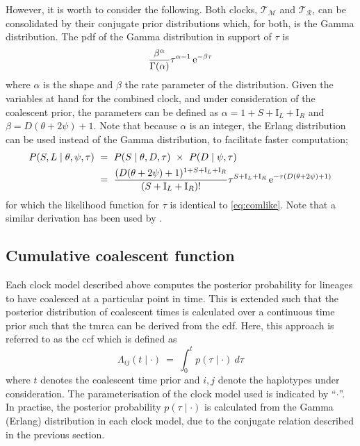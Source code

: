 However, it is worth to consider the following.
Both clocks, $\mathcal{T_{\!\!M}}$ and $\mathcal{T_{\!R}}$, can be consolidated by their conjugate prior distributions which, for both, is the Gamma distribution.
The \gls{pdf} of the Gamma distribution in support of $\tau$ is
\begin{equation*}
	\frac{\beta^\alpha}{\Gamma(\alpha)} \tau^{\alpha - 1} \,\mathrm{e}^{-\beta \tau}
\end{equation*}
where $\alpha$ is the shape and $\beta$ the rate parameter of the distribution.
Given the variables at hand for the combined clock, and under consideration of the coalescent prior, the parameters can be defined as ${\alpha = 1+ S + \mathrm{I}_L + \mathrm{I}_R}$ and ${\beta = D(\theta + 2 \psi) + 1}$.
Note that because $\alpha$ is an integer, the Erlang distribution can be used instead of the Gamma distribution, \eg to facilitate faster computation;
\begin{equation}\label{eq:comgamma}
\begin{split}
	P(S,L \mid \theta,\psi,\tau)
	& ~ = ~ P(S \mid \theta,D,\tau) ~\times~ P(D \mid \psi,\tau) \\
	& ~ = ~ \frac{(D(\theta + 2\psi) + 1)^{1 + S + \mathrm{I}_L + \mathrm{I}_R}}{(S + \mathrm{I}_L + \mathrm{I}_R)!} \tau^{S + \mathrm{I}_L + \mathrm{I}_R} \,\mathrm{e}^{-\tau (D(\theta + 2\psi) + 1)}
\end{split}
\end{equation}
for which the likelihood function for $\tau$ is identical to \cref{eq:comlike}.
Note that a similar derivation has been used by \citet{schroff2016}.


%
\subsection{Cumulative coalescent function}
%

Each clock model described above computes the posterior probability for  lineages to have coalesced at a particular point in time.
This is extended such that the posterior distribution of coalescent times is calculated over a continuous time prior such that the \gls{tmrca} can be derived from the \gls{cdf}.
Here, this approach is referred to as the \gls{ccf} which is defined as
\begin{equation}
	\Lambda_{ij}(t \mid \cdot) ~=~ \int_{0}^{t} p(\tau\mid\cdot)~d\tau
\end{equation}
where $t$ denotes the coalescent time prior and $i,j$ denote the  haplotypes under consideration.
The parameterisation of the clock model used is indicated by ``$\cdot$''.
In practise, the posterior probability ${p(\tau\mid\cdot)}$ is calculated from the Gamma (Erlang) distribution in each clock model, due to the conjugate relation described in the previous section.



